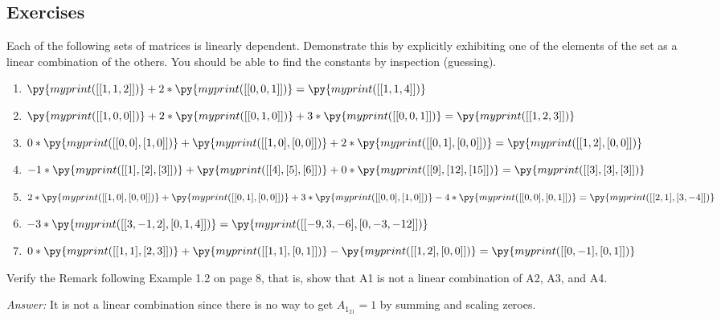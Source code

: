 \documentclass[letter]{article}
\newcommand{\ans}{\textit{Answer: }}
\newenvironment{question}[2][Question]{\begin{trivlist}
\item[\hskip \labelsep {\bfseries #1}\hskip \labelsep {\bfseries #2.}]}{\end{trivlist}}
\begin{document}
\subsection{Exercises}

\begin{question}{1.2}
  Each of the following sets of matrices is linearly dependent. Demonstrate this 
  by explicitly exhibiting one of the elements of the set as a linear
  combination of the others. You should be able to find the constants by inspection (guessing).

\begin{enumerate}[label=\alph*]
  \item $
    \py{myprint([[1, 1, 2]])} + 2*\py{myprint([[0, 0, 1]])} = \py{myprint([[1, 1, 4]])}
  $

  \item $
    \py{myprint([[1,0,0]])}
    + 2 * \py{myprint([[0,1,0]])}
    + 3 * \py{myprint([[0,0,1]])}
    = \py{myprint([[1,2,3]])}
  $

  \item $
    0 * \py{myprint([[0, 0],
                 [1, 0]])}
    + \py{myprint([[1, 0],
                 [0, 0]])}
    + 2 * \py{myprint([[0, 1],
                       [0, 0]])}
    = \py{myprint([[1, 2],
                   [0, 0]])}
  $

  \item $
  -1 *\py{myprint([[1],
               [2],
               [3]])}
  + \py{myprint([[4],
                   [5],
                   [6]])}
  + 0 * \py{myprint([[9],
                   [12],
                   [15]])}
  = \py{myprint([[3],
               [3],
               [3]])}
  $

  \item $
  2 * \py{myprint([[1, 0], [0, 0]])}
  + \py{myprint([[0, 1], [0, 0]])}
  + 3 * \py{myprint([[0, 0], [1, 0]])}
  -4 * \py{myprint([[0, 0], [0, 1]])}
  = \py{myprint([[2, 1], [3, -4]])}
  $

  \item $
  -3 * \py{myprint([[3, -1, 2], [0, 1, 4]])}
  = \py{myprint([[-9, 3, -6], [0, -3, -12]])}
  $

  \item $
  0 * \py{myprint([[1, 1], [2, 3]])}
  + \py{myprint([[1, 1], [0, 1]])}
  - \py{myprint([[1, 2], [0, 0]])}
  = \py{myprint([[0, -1], [0, 1]])}
  $
\end{enumerate}
\end{question}

\begin{question}{1.8}
  Verify the Remark following Example 1.2 on page 8, that is, show that A1 is not a linear combination of A2, A3, and A4.

  \ans It is not a linear combination since there is no way to get $A_{1_{21}} = 1$ 
  by summing and scaling zeroes.
\end{question}
\end{document}

